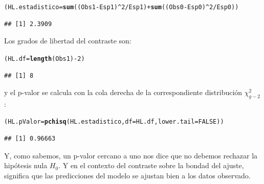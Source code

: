 \documentclass[10pt,a4paper]{article}\usepackage[]{graphicx}\usepackage[]{color}
\makeatletter
\newcommand{\hlnum}[1]{\textcolor[rgb]{0.686,0.059,0.569}{#1}}%
\newcommand{\hlopt}[1]{\textcolor[rgb]{0,0,0}{#1}}%
\newcommand{\hlstd}[1]{\textcolor[rgb]{0.345,0.345,0.345}{#1}}%
\newcommand{\hlkwb}[1]{\textcolor[rgb]{0.69,0.353,0.396}{#1}}%
\newcommand{\hlkwc}[1]{\textcolor[rgb]{0.333,0.667,0.333}{#1}}%
\newcommand{\hlkwd}[1]{\textcolor[rgb]{0.737,0.353,0.396}{\textbf{#1}}}%
\newenvironment{kframe}{%
 \def\at@end@of@kframe{}%
 \ifinner\ifhmode%
  \def\at@end@of@kframe{\end{minipage}}%
  \begin{minipage}{\columnwidth}%
 \fi\fi%
 \def\FrameCommand##1{\hskip\@totalleftmargin \hskip-\fboxsep
 \colorbox{shadecolor}{##1}\hskip-\fboxsep
     \hskip-\linewidth \hskip-\@totalleftmargin \hskip\columnwidth}%
 \MakeFramed {\advance\hsize-\width
   \@totalleftmargin\z@ \linewidth\hsize
   \@setminipage}}%
 {\par\unskip\endMakeFramed%
 \at@end@of@kframe}
\newenvironment{knitrout}{}{} %
\newcounter {cont01}
\makeatother
\begin{document}
\begin{knitrout}
\color{fgcolor}\begin{kframe}
\begin{alltt}
\hlstd{(HL.estadistico} \hlkwb{=} \hlkwd{sum}\hlstd{((Obs1} \hlopt{-} \hlstd{Esp1)}\hlopt{^}\hlnum{2}\hlopt{/}\hlstd{Esp1)} \hlopt{+} \hlkwd{sum}\hlstd{((Obs0} \hlopt{-} \hlstd{Esp0)}\hlopt{^}\hlnum{2}\hlopt{/}\hlstd{Esp0))}
\end{alltt}
\begin{verbatim}
## [1] 2.3909
\end{verbatim}
\end{kframe}
\end{knitrout}

Los grados de libertad del contraste son:

\begin{knitrout}
\color{fgcolor}\begin{kframe}
\begin{alltt}
\hlstd{(HL.df} \hlkwb{=} \hlkwd{length}\hlstd{(Obs1)} \hlopt{-} \hlnum{2}\hlstd{)}
\end{alltt}
\begin{verbatim}
## [1] 8
\end{verbatim}
\end{kframe}
\end{knitrout}


y el p-valor se calcula con la cola derecha de la correspondiente distribución $\chi^2_{g - 2}$:

\begin{knitrout}
\color{fgcolor}\begin{kframe}
\begin{alltt}
\hlstd{(HL.pValor} \hlkwb{=}  \hlkwd{pchisq}\hlstd{(HL.estadistico,} \hlkwc{df} \hlstd{= HL.df,} \hlkwc{lower.tail} \hlstd{=} \hlnum{FALSE}\hlstd{))}
\end{alltt}
\begin{verbatim}
## [1] 0.96663
\end{verbatim}
\end{kframe}
\end{knitrout}

Y, como sabemos, un p-valor cercano a uno nos dice que no debemos rechazar la hipótesis nula $H_0$. Y en el contexto del contraste sobre la bondad del ajuste, significa que las predicciones del modelo se ajustan bien a los datos observado.
\end{document}
